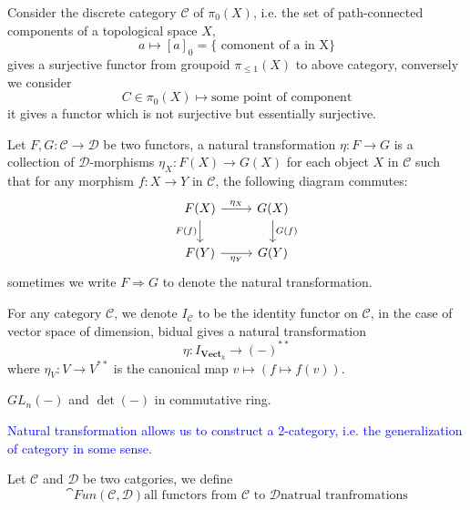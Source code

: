 \begin{example}
    Consider the discrete category \(\mathcal{C} \) of \(\pi_0(X)\), i.e. the set of path-connected components of a topological space \(X\), 
    \[a \mapsto [a]_0 = \{\text{ comonent of a in X}\}\]
    gives a surjective functor from groupoid \(\pi_{\leq 1}(X)\) to above category, conversely we consider 
    \[C \in \pi_0(X) \mapsto \text{some point of component}\]
    it gives a functor which is not surjective but essentially surjective.
\end{example}

\begin{colordefinition}
    Let \(F,G: \mathcal{C} \to \mathcal{D}\) be two functors, a natural transformation \(\eta: F \to G\) is a collection of \(\mathcal{D}\)-morphisms \(\eta_X: F(X) \to G(X)\) for each object \(X\) in \(\mathcal{C}\) such that for any morphism \(f: X \to Y\) in \(\mathcal{C}\), the following diagram commutes:
    \[
    \begin{tikzcd}
    F(X) \arrow[r, "\eta_X"] \arrow[d, "F(f)"'] & G(X) \arrow[d, "G(f)"] \\
    F(Y) \arrow[r, "\eta_Y"'] & G(Y)
    \end{tikzcd}
    \]
    sometimes we write \(F \Rightarrow G\) to denote the natural transformation.
    
\end{colordefinition}

\begin{example}
    For any category \(\mathcal{C}\), we denote \(I_{\mathcal{C}}\)
to be the identity functor on \(\mathcal{C}\), in the case of vector space of dimension, bidual gives a natural transformation
    \[\eta: I_{\mathbf{Vect}_k} \to (-)^{**}\]
    where \(\eta_V: V \to V^{**}\) is the canonical map \(v \mapsto (f \mapsto f(v))\).
\end{example}

\begin{example}
    \(GL_n(-)\) and \(\det (-)\) in commutative ring.
\end{example}

\textcolor{blue}{Natural transformation allows us to construct a 2-category, i.e. the generalization of category in some sense.}

\begin{definition}
    Let \(\mathcal{C}\) and \(\mathcal{D}\) be two catgories, we define
    \[\cat{Fun(\mathcal{C},\mathcal{D})}{\text{all functors from }\mathcal{C}\text{ to }\mathcal{D}}{\text{natrual tranfromations}}\]
\end{definition}

